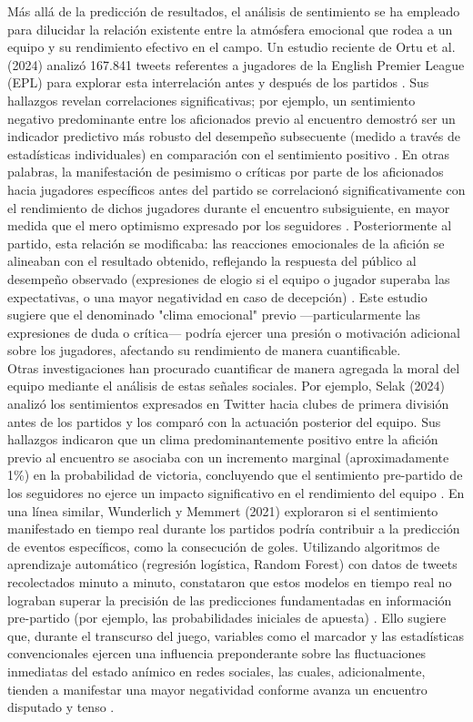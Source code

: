Más allá de la predicción de resultados, el análisis de sentimiento se ha empleado para dilucidar la relación existente entre la atmósfera emocional que rodea a un equipo y su rendimiento efectivo en el campo. Un estudio reciente de Ortu et al. (2024) analizó 167.841 tweets referentes a jugadores de la English Premier League (EPL) para explorar esta interrelación antes y después de los partidos \cite{Ortu2024}. Sus hallazgos revelan correlaciones significativas; por ejemplo, un sentimiento negativo predominante entre los aficionados previo al encuentro demostró ser un indicador predictivo más robusto del desempeño subsecuente (medido a través de estadísticas individuales) en comparación con el sentimiento positivo \cite{Ortu2024}. En otras palabras, la manifestación de pesimismo o críticas por parte de los aficionados hacia jugadores específicos antes del partido se correlacionó significativamente con el rendimiento de dichos jugadores durante el encuentro subsiguiente, en mayor medida que el mero optimismo expresado por los seguidores \cite{Ortu2024}. Posteriormente al partido, esta relación se modificaba: las reacciones emocionales de la afición se alineaban con el resultado obtenido, reflejando la respuesta del público al desempeño observado (expresiones de elogio si el equipo o jugador superaba las expectativas, o una mayor negatividad en caso de decepción) \cite{Ortu2024}. Este estudio sugiere que el denominado "clima emocional" previo —particularmente las expresiones de duda o crítica— podría ejercer una presión o motivación adicional sobre los jugadores, afectando su rendimiento de manera cuantificable.\\

Otras investigaciones han procurado cuantificar de manera agregada la moral del equipo mediante el análisis de estas señales sociales. Por ejemplo, Selak (2024) analizó los sentimientos expresados en Twitter hacia clubes de primera división antes de los partidos y los comparó con la actuación posterior del equipo. Sus hallazgos indicaron que un clima predominantemente positivo entre la afición previo al encuentro se asociaba con un incremento marginal (aproximadamente 1\%) en la probabilidad de victoria, concluyendo que el sentimiento pre-partido de los seguidores no ejerce un impacto significativo en el rendimiento del equipo \cite{Selak2024}. En una línea similar, Wunderlich y Memmert (2021) exploraron si el sentimiento manifestado en tiempo real durante los partidos podría contribuir a la predicción de eventos específicos, como la consecución de goles. Utilizando algoritmos de aprendizaje automático (regresión logística, Random Forest) con datos de tweets recolectados minuto a minuto, constataron que estos modelos en tiempo real no lograban superar la precisión de las predicciones fundamentadas en información pre-partido (por ejemplo, las probabilidades iniciales de apuesta) \cite{Selak2024}. Ello sugiere que, durante el transcurso del juego, variables como el marcador y las estadísticas convencionales ejercen una influencia preponderante sobre las fluctuaciones inmediatas del estado anímico en redes sociales, las cuales, adicionalmente, tienden a manifestar una mayor negatividad conforme avanza un encuentro disputado y tenso \cite{Selak2024}.\\


